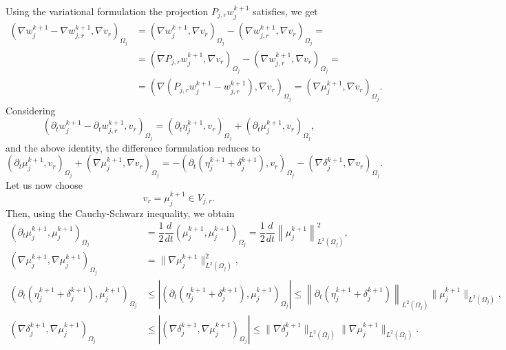 \documentclass[a4paper, 11pt]{article}
\theoremstyle{remark}
\begin{document}
Using the variational formulation the projection $P_{j,r} w_j^{k+1}$ satisfies, we get
\begin{align*}
    \left(\nabla w_{j}^{k+1} - \nabla w_{j, r}^{k+1}, \nabla v_{r}\right)_{\Omega_{j}} &= \left(\nabla w_{j}^{k+1}, \nabla v_{r}\right)_{\Omega_{j}} - \left(\nabla w_{j, r}^{k+1}, \nabla v_{r}\right)_{\Omega_{j}} = \\
    &= \left(\nabla P_{j,r} w_j^{k+1}, \nabla v_r\right)_{\Omega_j} - \left(\nabla w_{j, r}^{k+1}, \nabla v_{r}\right)_{\Omega_{j}} =\\
    &= \left(\nabla \left(P_{j,r} w_j^{k+1} - w_{j, r}^{k+1}\right), \nabla v_r\right)_{\Omega_j} = \left(\nabla \mu_{j}^{k+1}, \nabla v_r\right)_{\Omega_j}.
\end{align*}
Considering
\begin{equation*}
    \left(\partial_{t} w_{j}^{k+1} - \partial_{t} w_{j, r}^{k+1}, v_{r}\right)_{\Omega_{j}} = \left(\partial_{t} \eta_{j}^{k+1}, v_{r}\right)_{\Omega_{j}} + \left(\partial_{t} \mu_{j}^{k+1}, v_{r}\right)_{\Omega_{j}},
\end{equation*}
and the above identity, the difference formulation reduces to
\begin{equation*}
    \left(\partial_{t}\mu_{j}^{k+1}, v_{r}\right)_{\Omega_{j}} + \left(\nabla \mu_{j}^{k+1}, \nabla v_{r}\right)_{\Omega_{j}} = -\left(\partial_{t}\left(\eta_{j}^{k+1} + \delta_{j}^{k+1}\right), v_{r}\right)_{\Omega_{j}} - \left(\nabla \delta_{j}^{k+1}, \nabla v_{r}\right)_{\Omega_{j}}.
\end{equation*}
Let us now choose
\begin{equation*}
    v_{r} = \mu_{j}^{k+1}\in V_{j, r}.
\end{equation*}
Then, using the Cauchy-Schwarz inequality, we obtain
\begin{align*}
    \left(\partial_{t}\mu_{j}^{k+1}, \mu_{j}^{k+1}\right)_{\Omega_{j}} &= \dfrac{1}{2} \dfrac{d}{dt} \left(\mu_{j}^{k+1}, \mu_{j}^{k+1}\right)_{\Omega_{j}} = \dfrac{1}{2}\dfrac{d}{dt}\left\lVert \mu_{j}^{k+1}\right\rVert^{2}_{L^{2}(\Omega_{j})},\\
    \left(\nabla \mu_{j}^{k+1}, \nabla \mu_{j}^{k+1}\right)_{\Omega_{j}} &= \lVert \nabla \mu_{j}^{k+1}\rVert^{2}_{L^{2}(\Omega_{j})},\\
    \left(\partial_{t}\left(\eta_{j}^{k+1} + \delta_{j}^{k+1}\right), \mu_{j}^{k+1}\right)_{\Omega_{j}} &\leq \left|\left(\partial_{t}\left(\eta_{j}^{k+1} + \delta_{j}^{k+1}\right), \mu_{j}^{k+1}\right)_{\Omega_{j}}\right| \leq \left\lVert \partial_{t}\left(\eta_{j}^{k+1} + \delta_{j}^{k+1}\right)\right\rVert_{L^{2}(\Omega_{j})}\lVert \mu_{j}^{k+1}\rVert_{L^{2}(\Omega_{j})},\\
    \left(\nabla \delta_{j}^{k+1}, \nabla \mu_{j}^{k+1}\right)_{\Omega_{j}} &\leq \left|\left(\nabla \delta_{j}^{k+1}, \nabla \mu_{j}^{k+1}\right)_{\Omega_{j}}\right| \leq \lVert \nabla \delta_{j}^{k+1}\rVert_{L^{2}(\Omega_{j})}\lVert \nabla \mu_{j}^{k+1}\rVert_{L^{2}(\Omega_{j})}.
\end{align*}
\end{document}
